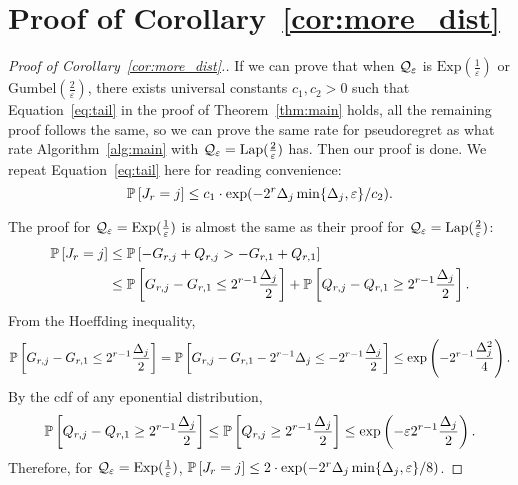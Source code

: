 \section{Proof of Corollary~\ref{cor:more_dist}}
\label{sec:app_proof_cor}
\begin{proof}[Proof of Corollary~\ref{cor:more_dist}.]
If we can prove that when $\mathcal{Q}_{\varepsilon}$ is $\mathrm{Exp}(\frac{1}{\varepsilon})$ or $\mathrm{Gumbel}(\frac{2}{\varepsilon})$, there exists universal constants $c_1, c_2>0$ such that Equation~\ref{eq:tail} in the proof of Theorem~\ref{thm:main} holds, all the remaining proof follows the same, so we can prove the same rate for pseudoregret as what rate Algorithm~\ref{alg:main} with $\mathcal{Q}_{\varepsilon}=\mathrm{Lap}(\frac{2}{\varepsilon})$ has. Then our proof is done. We repeat Equation~\ref{eq:tail} here for reading convenience:
$$
	\mathbb{P}\left[J_r = j\right]\leq c_1\cdot \exp(-2^r\Delta_j \min\{\Delta_j, \varepsilon\} / c_2).
$$

The proof for $\mathcal{Q}_{\varepsilon}=\mathrm{Exp}(\frac{1}{\varepsilon})$ is almost the same as their proof for $\mathcal{Q}_{\varepsilon}=\mathrm{Lap}(\frac{2}{\varepsilon})$:
\begin{align*}
	\mathbb{P}\left[J_r = j\right] &\leq \mathbb{P}\left[-G_{r, j} + Q_{r, j} > -G_{r, 1} + Q_{r, 1}\right]\\
	&\leq  \mathbb{P}\left[ G_{r, j} -G_{r, 1} \leq 2^{r-1}\frac{\Delta_j}{2}\right] + \mathbb{P}\left[ Q_{r, j} -Q_{r, 1} \geq 2^{r-1}\frac{\Delta_j}{2}\right].
\end{align*}
From the Hoeffding inequality, 
$$\mathbb{P}\left[ G_{r, j} -G_{r, 1} \leq 2^{r-1}\frac{\Delta_j}{2}\right] = \mathbb{P}\left[ G_{r, j} -G_{r, 1} - 2^{r-1}\Delta_j \leq -2^{r-1}\frac{\Delta_j}{2}\right] \leq \exp\left(-2^{r-1}\frac{\Delta_j^2}{4}\right).$$
By the cdf of any eponential distribution, 
$$\mathbb{P}\left[ Q_{r, j} -Q_{r, 1} \geq 2^{r-1}\frac{\Delta_j}{2}\right] \leq \mathbb{P}\left[ Q_{r, j} \geq 2^{r-1}\frac{\Delta_j}{2}\right] \leq \exp\left(-\varepsilon 2^{r-1}\frac{\Delta_j}{2}\right).$$
Therefore, for $\mathcal{Q}_{\varepsilon}=\mathrm{Exp}(\frac{1}{\varepsilon})$, $\mathbb{P}\left[J_r = j\right]\leq 2\cdot \exp(-2^r\Delta_j \min\{\Delta_j, \varepsilon\}/8)$.
	

\end{proof}
